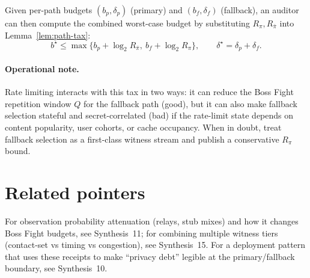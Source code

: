 \documentclass[11pt]{article}
\newcommand{\logtwo}{\log_2}
\begin{document}
Given per-path budgets $(b_p,\delta_p)$ (primary) and $(b_f,\delta_f)$ (fallback),
an auditor can then compute the combined worst-case budget by substituting $R_{\pi},R_{\bar\pi}$ into Lemma~\ref{lem:path-tax}:
\[
b^\star \le \max\{b_p+\logtwo R_{\bar\pi},\ b_f+\logtwo R_{\pi}\},\qquad
\delta^\star=\delta_p+\delta_f.
\]

\paragraph{Operational note.}
Rate limiting interacts with this tax in two ways:
it can reduce the Boss Fight repetition window $Q$ for the fallback path (good), but it can also make fallback selection stateful and secret-correlated (bad) if the rate-limit state depends on content popularity, user cohorts, or cache occupancy.
When in doubt, treat fallback selection as a first-class witness stream and publish a conservative $R_{\pi}$ bound.

\section{Related pointers}
For observation probability attenuation (relays, stub mixes) and how it changes Boss Fight budgets, see Synthesis~11; for combining multiple witness tiers (contact-set vs timing vs congestion), see Synthesis~15.\cite{series:obsatten,series:tieredobs}
For a deployment pattern that uses these receipts to make ``privacy debt'' legible at the primary/fallback boundary, see Synthesis~10.\cite{series:tieredpattern}
\end{document}
